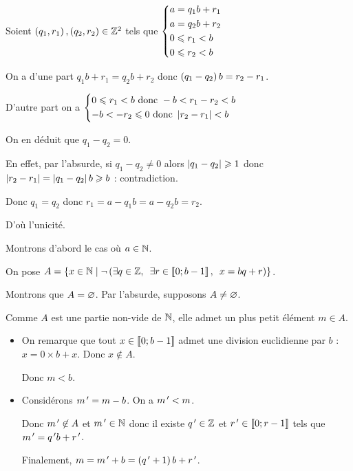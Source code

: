 \begin{dem}
\unicite

Soient \(\paren{q_1,r_1},\paren{q_2,r_2}\in\Z^2\) tels que \(\begin{dcases}
a=q_1b+r_1 \\
a=q_2b+r_2 \\
0\leq r_1<b \\
0\leq r_2<b
\end{dcases}\)

On a d'une part \(q_1b+r_1=q_2b+r_2\) donc \(\paren{q_1-q_2}b=r_2-r_1\).

D'autre part on a \(\begin{dcases}0\leq r_1<b\text{ donc }-b<r_1-r_2<b \\ -b<-r_2\leq0\text{ donc }\abs{r_2-r_1}<b\end{dcases}\)

On en déduit que \(q_1-q_2=0\).

En effet, par l'absurde, si \(q_1-q_2\not=0\) alors \(\abs{q_1-q_2}\geq1\) donc \(\abs{r_2-r_1}=\abs{q_1-q_2}b\geq b\) : contradiction.

Donc \(q_1=q_2\) donc \(r_1=a-q_1b=a-q_2b=r_2\).

D'où l'unicité.

\existence

Montrons d'abord le cas où \(a\in\N\).

On pose \(A=\accol{x\in\N\tq\non\paren{\quantifs{\exists q\in\Z;\exists r\in\interventierii{0}{b-1}}x=bq+r}}\).

Montrons que \(A=\ensvide\). Par l'absurde, supposons \(A\not=\ensvide\).

Comme \(A\) est une partie non-vide de \(\N\), elle admet un plus petit élément \(m\in A\).

\begin{itemize}
\item On remarque que tout \(x\in\interventierii{0}{b-1}\) admet une division euclidienne par \(b\) : \(x=0\times b+x\). Donc \(x\not\in A\).

Donc \(m<b\).

\item Considérons \(m\prim=m-b\). On a \(m\prim<m\).

Donc \(m\prim\not\in A\) et \(m\prim\in\N\) donc il existe \(q\prim\in\Z\) et \(r\prim\in\interventierii{0}{r-1}\) tels que \(m\prim=q\prim b+r\prim\).

Finalement, \(m=m\prim+b=\paren{q\prim+1}b+r\prim\).


\end{itemize}
\end{dem}
